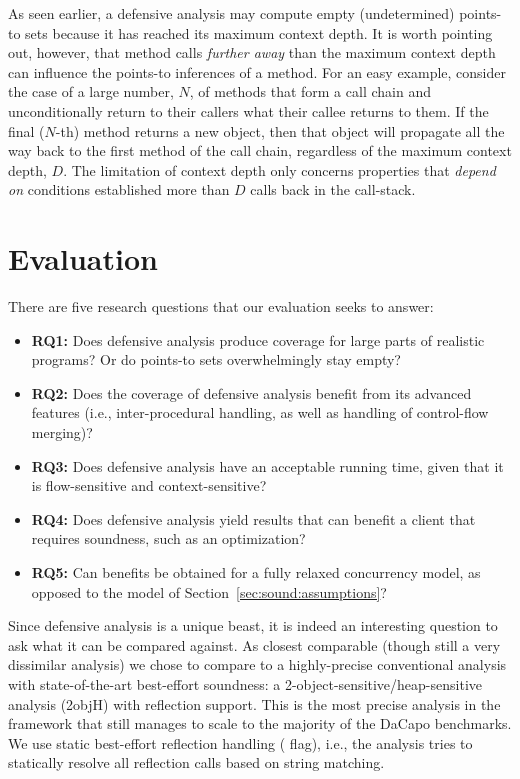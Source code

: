 As seen earlier, a defensive analysis may compute empty (undetermined) points-to sets because it has reached its maximum context depth. It is worth pointing out, however, that method calls \emph{further away} than the maximum context depth can influence the points-to inferences of a method. For an easy example, consider the case of a large number, $N$, of methods that form a call chain and unconditionally return to their callers what their callee returns to them. If the final ($N$-th) method returns a new object, then that object will propagate all the way back to the first method of the call chain, regardless of the maximum context depth, $D$. The limitation of context depth only concerns properties that \emph{depend on} conditions established more than $D$ calls back in the call-stack.


\section{Evaluation}

There are five research questions that our evaluation seeks to answer:
\begin{itemize}
\item \textbf{RQ1:} Does defensive analysis produce coverage for large parts of realistic programs? Or do points-to sets overwhelmingly stay empty?

\item \textbf{RQ2:} Does the coverage of defensive analysis benefit from its advanced features (i.e., inter-procedural handling, as well as handling of control-flow merging)? 

\item \textbf{RQ3:} Does defensive analysis have an acceptable running time, given that it is flow-sensitive and context-sensitive?

\item \textbf{RQ4:} Does defensive analysis yield results that can benefit a client that requires soundness, such as an optimization?

\item \textbf{RQ5:} Can benefits be obtained for a fully relaxed concurrency model, as opposed to the model of Section~\ref{sec:sound:assumptions}?
\end{itemize}


Since defensive analysis is a unique beast, it is indeed an interesting question to ask what it can be compared against. As closest comparable (though still a very dissimilar analysis) we chose to compare to a highly-precise conventional analysis with state-of-the-art best-effort soundness: a 2-object-sensitive/heap-sensitive analysis (2objH) with reflection support. This is the most precise analysis in the \doop{} framework that still manages to scale to the majority of the DaCapo benchmarks. We use static best-effort reflection handling ( flag), i.e., the analysis tries to statically resolve all reflection calls based on string matching.
  
